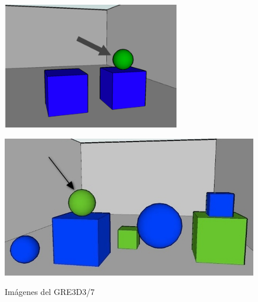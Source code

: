 \begin{figure}[!ht]
\begin{minipage}[b]{0.435\linewidth}
\centering
\includegraphics[width=\textwidth]{images/GRE3D3.png}\\[0pt]
\caption{}
\label{fig-GRE3D3}
\end{minipage}
\hspace*{0cm}
\begin{minipage}[b]{0.565\linewidth}
\centering
\includegraphics[width=\textwidth]{images/3.jpg}\\[0pt]
\caption{}
\label{fig-GRE3D7}
\end{minipage}
\caption{Im\'agenes del GRE3D3/7}
\end{figure}

\vspace*{1cm}

